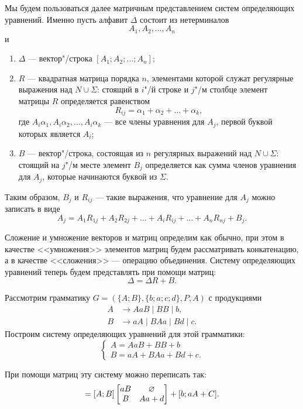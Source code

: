 Мы будем пользоваться далее матричным представлением систем
определяющих уравнений. Именно пусть алфавит $\Delta$ состоит из
нетерминалов
\[
A_1, A_2, \ldots , A_n
\]
и
\begin{enumerate}
    \item $\Delta$ --- вектор"/строка $[A_1;A_2;\ldots ;A_n]$;

    \item $R$ --- квадратная матрица порядка $n$, элементами которой
    служат регулярные выражения над $N\cup\Sigma$: стоящий в $i$"/й
    строке и $j$"/м столбце элемент матрицы $R$ определяется равенством
    \[
        R_{ij} = \alpha_1 + \alpha_2 + \ldots + \alpha_k,
    \]
    где $A_i\alpha_1, A_i\alpha_2, \ldots , A_i\alpha_k$ --- все члены
    уравнения для $A_j$, первой буквой которых является $A_i$;

    \item $B$ --- вектор"/строка, состоящая из $n$ регулярных
    выражений над $N\cup\Sigma$: стоящий на $j$"/м месте элемент $B_j$
    определяется как сумма членов уравнения для $A_j$, которые
    начинаются буквой из $\Sigma$.
\end{enumerate}

Таким образом, $B_j$ и $R_{ij}$ --- такие выражения, что уравнение для $A_j$ можно записать в виде
\[
A_j = A_1R_{1j} + A_2R_{2j} + \ldots + A_iR_{ij} + \ldots + A_nR_{nj} + B_j.
\]

Сложение и умножение векторов и матриц определим как обычно, при этом в качестве <<умножения>> элементов матриц будем рассматривать конкатенацию, а в качестве <<сложения>> --- операцию объединения. Систему определяющих уравнений теперь будем представлять при помощи матриц:
\begin{equation}
\label{eqGeneralSOS}
\Delta=\Delta R+B.
\end{equation}

\begin{myexample}
\label{example-MatrView}
Рассмотрим грамматику $G=(\{A;B\},\{b;a;c;d\},P,A)$ с продукциями
\begin{align*}
    A &\to AaB \mid BB \mid b, \\
    B &\to aA \mid BAa \mid Bd \mid c.
\end{align*}
Построим систему определяющих уравнений для этой грамматики:
\begin{equation*}
\begin{cases}
	A = AaB + BB + b \\
	B = aA + BAa + Bd + c.
\end{cases}
\end{equation*}

При помощи матриц эту систему можно переписать так:
\begin{equation}
[A;B] = [A;B]
\begin{bmatrix}
aB & \es \\
B & Aa+d
\end{bmatrix} + [b;aA+C].
\end{equation}
\end{myexample}


